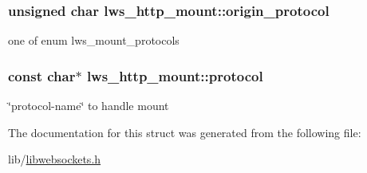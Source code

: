 \subsubsection[{\texorpdfstring{origin\+\_\+protocol}{origin\_protocol}}]{\setlength{\rightskip}{0pt plus 5cm}unsigned char lws\+\_\+http\+\_\+mount\+::origin\+\_\+protocol}\hypertarget{structlws__http__mount_a6a9b1492a0b9749e39bd19932717a0b7}{}\label{structlws__http__mount_a6a9b1492a0b9749e39bd19932717a0b7}
one of enum lws\+\_\+mount\+\_\+protocols 
\subsubsection[{\texorpdfstring{protocol}{protocol}}]{\setlength{\rightskip}{0pt plus 5cm}const char$\ast$ lws\+\_\+http\+\_\+mount\+::protocol}\hypertarget{structlws__http__mount_a05347d92c3d379809564bd4f3eab259b}{}\label{structlws__http__mount_a05347d92c3d379809564bd4f3eab259b}
\char`\"{}protocol-\/name\char`\"{} to handle mount 

The documentation for this struct was generated from the following file\+:\begin{DoxyCompactItemize}
\item 
lib/\hyperlink{libwebsockets_8h}{libwebsockets.\+h}\end{DoxyCompactItemize}

